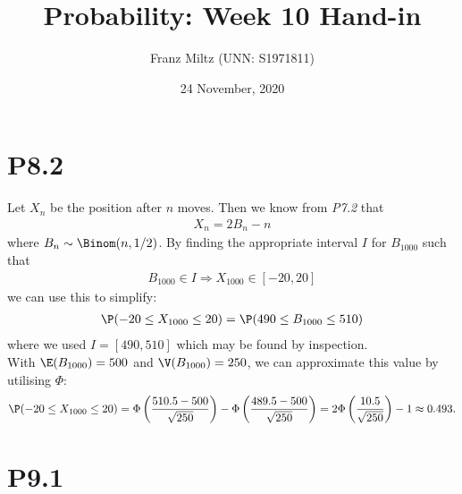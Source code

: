 \documentclass{article}
\begin{document}
\title{Probability: Week 10 Hand-in}
\author{Franz Miltz (UNN: S1971811)}
\date{24 November, 2020}
\maketitle

\section*{P8.2}

Let $X_n$ be the position after $n$ moves. Then we know from \emph{P7.2}
that
\begin{align*}
  X_n = 2B_n-n
\end{align*}
where $B_n\sim\Binom(n,1/2)$. By finding the appropriate interval $I$
for $B_{1000}$ such that
\begin{align*}
  B_{1000}\in I\Rightarrow X_{1000}\in [-20, 20]
\end{align*}
we can use this to simplify:
\begin{align*}
  \P(-20\leq X_{1000} \leq 20) = \P(490 \leq B_{1000} \leq 510)
\end{align*}
where we used $I=[490, 510]$ which may be found by inspection.\\
With $\E(B_{1000})=500$ and $\V(B_{1000})=250$, we can approximate this value
by utilising $\Phi$:
\begin{align*}
  \P(-20\leq X_{1000} \leq 20) = \Phi\left(\frac{510.5-500}{\sqrt{250}}\right)
  - \Phi\left(\frac{489.5-500}{\sqrt{250}}\right)
  = 2\Phi\left(\frac{10.5}{\sqrt{250}}\right)-1\approx 0.493.
\end{align*}

\section*{P9.1}
\end{document}
